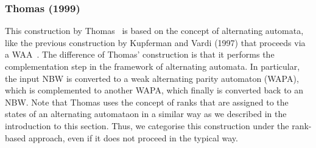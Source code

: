 


\subsubsection{Thomas (1999)}
\label{2_th99}
This construction by Thomas~\cite{1999_thomas} is based on the concept of alternating automata, like the previous construction by Kupferman and Vardi (1997) that proceeds via a WAA~\cite{1997_vardi}. The difference of Thomas' construction is that it performs the complementation step in the framework of alternating automata. In particular, the input NBW is converted to a weak alternating parity automaton (WAPA), which is complemented to another WAPA, which finally is converted back to an NBW. Note that Thomas uses the concept of ranks that are assigned to the states of an alternating automataon in a similar way as we described in the introduction to this section. Thus, we categorise this construction under the rank-based approach, even if it does not proceed in the typical way.


